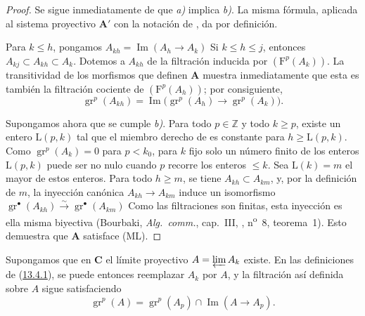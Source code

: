 \begin{proof}
Se sigue inmediatamente de  que \emph{a)} implica
\emph{b)}. La misma fórmula, aplicada al sistema proyectivo
$\mathbf A'$ con la notación de , da
 por definición.

Para $k\leq h$, pongamos
$A_{kh}=\operatorname{Im}(A_h\to A_k)$
Si $k\leq h\leq j$, entonces
$A_{kj}\subset A_{kh}\subset A_k$.
Dotemos a $A_{kh}$ de la filtración inducida por
$(\mathrm F^p(A_k))$.
La transitividad de los morfismos que definen $\mathbf A$ muestra
inmediatamente que esta es también la filtración cociente de
$(\mathrm F^p(A_h))$; por consiguiente,
\begin{equation}
\label{0.13.4.3.2-fr}
\tag{13.4.3.2}
\operatorname{gr}^p(A_{kh})=
\operatorname{Im}\bigl(\operatorname{gr}^p(A_h)\longrightarrow
\operatorname{gr}^p(A_k)\bigr).
\end{equation}

Supongamos ahora que se cumple \emph{b)}.
Para todo $p\in\mathbb Z$ y todo $k\geq p$, existe un entero
$\mathrm L(p,k)$ tal que el miembro derecho de
 es constante para $h\geq\mathrm L(p,k)$.
Como $\operatorname{gr}^p(A_k)=0$ para $p<k_0$, para $k$ fijo solo
un número finito de los enteros $\mathrm L(p,k)$ puede ser no nulo cuando
$p$ recorre los enteros $\leq k$.
Sea $\mathrm L(k)=m$ el mayor de estos enteros.
Para todo $h\geq m$, se tiene
$A_{kh}\subset A_{km}$, y, por la definición de $m$, la inyección
canónica
$A_{kh}\to A_{km}$ induce un isomorfismo
$\operatorname{gr}^\bullet(A_{kh})\xrightarrow{\sim}
\operatorname{gr}^\bullet(A_{km})$
Como las filtraciones son finitas, esta inyección es ella misma biyectiva
(Bourbaki, \emph{Alg.\ comm.}, cap.~III, ,
n\textsuperscript{o}~8, teorema~1).
Esto demuestra que $\mathbf A$ satisface (ML).
\end{proof}

\begin{env}[13.4.4]
\label{0.13.4.4-fr}
Supongamos que en $\boldsymbol{C}$ el límite proyectivo $A=\varprojlim A_k$ existe. En las definiciones de (\hyperref[0.13.4.1-fr]{13.4.1}), se puede entonces reemplazar $A_k$
por $A$, y la filtración así definida sobre $A$ sigue satisfaciendo
\begin{equation}
\label{0.13.4.4.1-fr}
\tag{13.4.4.1}
\operatorname{gr}^p(A)=\operatorname{gr}^p(A_p)
\cap\operatorname{Im}(A\longrightarrow A_p).
\end{equation}
\end{env}

